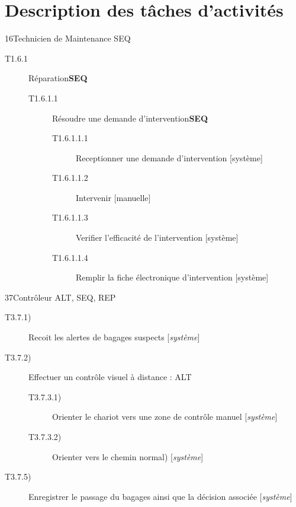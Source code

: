 \part{Description des tâches d'activités}

\dta
{1}{6}{Technicien de Maintenance}
{SEQ}
{
\begin{description}
	\item[T1.6.1] Réparation\textbf{SEQ}
	\begin{description}
		\item[T1.6.1.1] Résoudre une demande d'intervention\textbf{SEQ}
		\begin{description}
			\item[T1.6.1.1.1] Receptionner une demande d'intervention [système]
			\item[T1.6.1.1.2] Intervenir [manuelle]
			\item[T1.6.1.1.3] Verifier l'efficacité de l'intervention [système]
			\item[T1.6.1.1.4] Remplir la fiche électronique d'intervention [système]
		\end{description}
	\end{description}
\end{description}
}

\hspace{1cm}

\dta
{3}{7}{Contrôleur}
{ALT, SEQ, REP}
{
\begin{description}
	\item [T3.7.1)] Recoit les alertes de bagages suspects [\textsl{système}]
	\item [T3.7.2)] Effectuer un contrôle visuel à distance : ALT
	\begin{description}
		\item [T3.7.3.1)] Orienter le chariot vers une zone de contrôle manuel [\textsl{système}]
		\item [T3.7.3.2)] Orienter vers le chemin \og normal\fg) [\textsl{système}]
	\end{description}
	\item [T3.7.5)] Enregistrer le passage du bagages ainsi que la décision associée [\textsl{système}]
\end{description}
}

\hspace{1cm}

